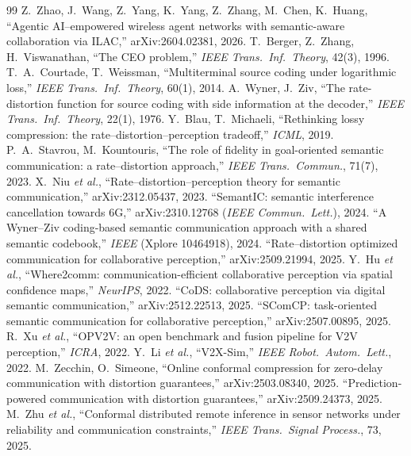 \documentclass[11pt,a4paper]{article}
\begin{document}
\begin{thebibliography}{99}\footnotesize
{} Z.~Zhao, J.~Wang, Z.~Yang, K.~Yang, Z.~Zhang, M.~Chen, K.~Huang, ``Agentic AI--empowered wireless agent networks with semantic-aware collaboration via ILAC,'' arXiv:2604.02381, 2026.
 T.~Berger, Z.~Zhang, H.~Viswanathan, ``The CEO problem,'' \emph{IEEE Trans.\ Inf.\ Theory}, 42(3), 1996.
 T.~A.~Courtade, T.~Weissman, ``Multiterminal source coding under logarithmic loss,'' \emph{IEEE Trans.\ Inf.\ Theory}, 60(1), 2014.
 A.~Wyner, J.~Ziv, ``The rate-distortion function for source coding with side information at the decoder,'' \emph{IEEE Trans.\ Inf.\ Theory}, 22(1), 1976.
 Y.~Blau, T.~Michaeli, ``Rethinking lossy compression: the rate--distortion--perception tradeoff,'' \emph{ICML}, 2019.
 P.~A.~Stavrou, M.~Kountouris, ``The role of fidelity in goal-oriented semantic communication: a rate--distortion approach,'' \emph{IEEE Trans.\ Commun.}, 71(7), 2023.
 X.~Niu \emph{et al.}, ``Rate--distortion--perception theory for semantic communication,'' arXiv:2312.05437, 2023.
 ``SemantIC: semantic interference cancellation towards 6G,'' arXiv:2310.12768 (\emph{IEEE Commun.\ Lett.}), 2024.
 ``A Wyner--Ziv coding-based semantic communication approach with a shared semantic codebook,'' \emph{IEEE} (Xplore 10464918), 2024.
 ``Rate--distortion optimized communication for collaborative perception,'' arXiv:2509.21994, 2025.
 Y.~Hu \emph{et al.}, ``Where2comm: communication-efficient collaborative perception via spatial confidence maps,'' \emph{NeurIPS}, 2022.
 ``CoDS: collaborative perception via digital semantic communication,'' arXiv:2512.22513, 2025.
 ``SComCP: task-oriented semantic communication for collaborative perception,'' arXiv:2507.00895, 2025.
 R.~Xu \emph{et al.}, ``OPV2V: an open benchmark and fusion pipeline for V2V perception,'' \emph{ICRA}, 2022.
 Y.~Li \emph{et al.}, ``V2X-Sim,'' \emph{IEEE Robot.\ Autom.\ Lett.}, 2022.
 M.~Zecchin, O.~Simeone, ``Online conformal compression for zero-delay communication with distortion guarantees,'' arXiv:2503.08340, 2025.
 ``Prediction-powered communication with distortion guarantees,'' arXiv:2509.24373, 2025.
 M.~Zhu \emph{et al.}, ``Conformal distributed remote inference in sensor networks under reliability and communication constraints,'' \emph{IEEE Trans.\ Signal Process.}, 73, 2025.

\end{thebibliography}
\end{document}
